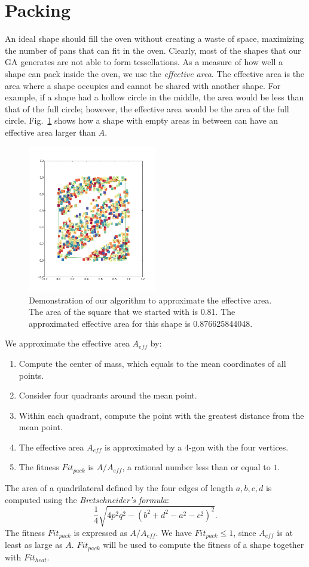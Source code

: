 \documentclass[12pt]{reedmcm}
\begin{document}
\section{Packing}
\label{sec:packing}
An ideal shape should fill the oven without creating a waste of space, maximizing the number of pans that can fit in the oven.
Clearly, most of the shapes that our GA generates are not able to form tessellations.
As a measure of how well a shape can pack inside the oven, we use the \textit{effective area}.
The effective area is the area where a shape occupies and cannot be shared with another shape.
For example, if a shape had a hollow circle in the middle, the area would be less than that of the full circle; however, the effective area would be the area of the full circle.
Fig.~\ref{fig:effarea} shows how a shape with empty areas in between can have an effective area larger than $A$.
\begin{figure}[h!]
  \centering
  \includegraphics[width=0.5\textwidth]{area_approx}
  \caption{Demonstration of our algorithm to approximate the effective area.
  The area of the square that we started with is 0.81.
  The approximated effective area for this shape is 0.876625844048.}
  \label{fig:effarea}
\end{figure}
%
We approximate the effective area $A_{eff}$ by:
\begin{enumerate}
  \item Compute the center of mass, which equals to the mean coordinates of all points.
  \item Consider four quadrants around the mean point.
  \item Within each quadrant, compute the point with the greatest distance from the mean point.
  \item The effective area $A_{eff}$ is approximated by a 4-gon with the four vertices.
  \item The fitness $Fit_{pack}$ is $A/A_{eff}$, a rational number less than or equal to $1$.
\end{enumerate}
The area of a quadrilateral defined by the four edges of length $a,b,c,d$ is computed using the \textit{Bretschneider's formula}:
\begin{equation*}
  \frac{1}{4}\sqrt{4p^2 q^2 - (b^2 + d^2 - a^2 - c^2)^2}.
\end{equation*}
The fitness $Fit_{pack}$ is expressed as $A/A_{eff}$.
We have $Fit_{pack} \leq 1$, since $A_{eff}$ is at least as large as $A$.
$Fit_{pack}$ will be used to compute the fitness of a shape together with $Fit_{heat}$.
\end{document}
